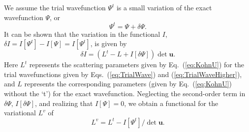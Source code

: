 \documentclass[preprint,showpacs,showkeys,preprintnumbers,amsmath,amssymb,longbibliography,pra,aps]{revtex4-1}
\begin{document}
{We assume the trial wavefunction $\Psi^t$ is a small variation of the exact
wavefunction
$\Psi$, or
\begin{equation}
\Psi^t = \Psi + \delta \Psi.
\label{eq:PsiTrialRelation}
\end{equation}
It can be shown that the variation in the functional $I$,
$\delta I = I[\Psi^t] - I[\Psi] = I[\Psi^t]$,
is given by
\begin{equation}
\delta I = (L^t - L + I[\delta \Psi]) \det \textbf{u}.
\label{eq:IlPsiVariation}
\end{equation}
Here $L^t$ represents the scattering parameters given by Eq.~(\ref{eq:KohnU})
for the trial wavefunctions given by Eqs.~(\ref{eq:TrialWave}) and
(\ref{eq:TrialWaveHigher}), and $L$ represents the corresponding parameters
(given by Eq.~(\ref{eq:KohnU}) without the `t') for the exact wavefunction.
Neglecting the second-order term in $\delta \Psi$, $I[\delta \Psi]$, and realizing that
$I[\Psi] = 0$, we obtain a functional for the variational $L^v$ of
\begin{equation}
L^v = L^t - I[\Psi^t] / \det \textbf{u}.
\label{eq:ComplexKohnVariation}
\end{equation}

}
\end{document}
